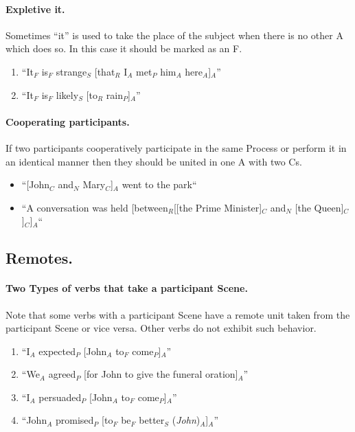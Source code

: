 \documentclass[11pt]{article}
\newcommand{\be}{\begin{enumerate}}
\newcommand{\ee}{\end{enumerate}}
\newcommand{\nss}[1]{}
\newcommand{\rem}[1]{{(\it #1})}
\begin{document}
\paragraph{Expletive it.} Sometimes ``it'' is used to take the place of the subject when there is no other A which does so. In this case it should be marked as an F.
\be
\item
``It$_F$ is$_F$ strange$_S$ [that$_R$ I$_A$ met$_P$ him$_A$ here$_A$]$_A$''
\item
``It$_F$ is$_F$ likely$_S$ [to$_R$ rain$_P$]$_A$''
\ee

\paragraph {Cooperating participants.} If two participants cooperatively participate in the same Process or perform it in an identical manner then they should be united in one A with two Cs. \nss{This only applies if they are coordinated, right? ``John and Mary played tennis'', not ``John played tennis with Mary.''}
 
\begin {itemize} 
\item
``[John$_C$ and$_N$ Mary$_C$]$_A$ went to the park``
\item
``A conversation was held [between$_R$[[the Prime Minister]$_C$ and$_N$ [the Queen]$_C$]$_C$]$_A$``
\end {itemize}


\subsection{Remotes.}

\paragraph{Two Types of verbs that take a participant Scene.} Note that some verbs with a participant Scene have a remote unit taken from the participant Scene or vice versa. Other verbs do not exhibit such behavior.
\be
\item
``I$_A$ expected$_P$ [John$_A$ to$_F$ come$_P$]$_A$''
\item
``We$_A$ agreed$_P$ [for John to give the funeral oration]$_A$''
\item
``I$_A$ persuaded$_P$ [John$_A$ to$_F$ come$_P$]$_A$''
\item
``John$_A$ promised$_P$ [to$_F$ be$_F$ better$_S$ \rem{John}$_A$]$_A$''
\ee
\end{document}
